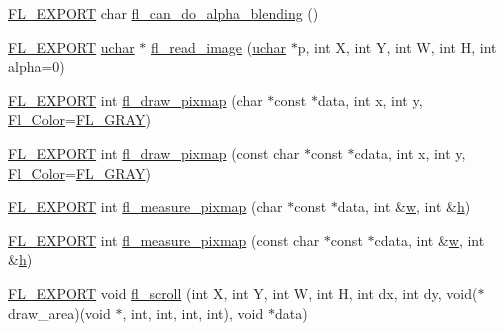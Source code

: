 \begin{DoxyCompactItemize}
\item 
\hyperlink{_fl___export_8_h_aa9ba29a18aee9d738370a06eeb4470fc}{F\+L\+\_\+\+E\+X\+P\+O\+RT} char \hyperlink{group__fl__drawings_gabc04f934741e868e3d537761a955bfdb}{fl\+\_\+can\+\_\+do\+\_\+alpha\+\_\+blending} ()
\item 
\hyperlink{_fl___export_8_h_aa9ba29a18aee9d738370a06eeb4470fc}{F\+L\+\_\+\+E\+X\+P\+O\+RT} \hyperlink{fl__types_8h_a65f85814a8290f9797005d3b28e7e5fc}{uchar} $\ast$ \hyperlink{group__fl__drawings_ga0cdc05d3f7689e1c6b8a26fd0bd97233}{fl\+\_\+read\+\_\+image} (\hyperlink{fl__types_8h_a65f85814a8290f9797005d3b28e7e5fc}{uchar} $\ast$p, int X, int Y, int W, int H, int alpha=0)
\item 
\hyperlink{_fl___export_8_h_aa9ba29a18aee9d738370a06eeb4470fc}{F\+L\+\_\+\+E\+X\+P\+O\+RT} int \hyperlink{group__fl__drawings_gaebd9b6111b8a511eff62749f1b756a31}{fl\+\_\+draw\+\_\+pixmap} (char $\ast$const $\ast$data, int x, int y, \hyperlink{_enumerations_8_h_a8b762953646f8abee866061f1af78a6a}{Fl\+\_\+\+Color}=\hyperlink{_enumerations_8_h_aabb3b3628ea5baa2ba176201ed5d2aba}{F\+L\+\_\+\+G\+R\+AY})
\item 
\hyperlink{_fl___export_8_h_aa9ba29a18aee9d738370a06eeb4470fc}{F\+L\+\_\+\+E\+X\+P\+O\+RT} int \hyperlink{group__fl__drawings_gab830e417d8f17fcd00acdb96711b9119}{fl\+\_\+draw\+\_\+pixmap} (const char $\ast$const $\ast$cdata, int x, int y, \hyperlink{_enumerations_8_h_a8b762953646f8abee866061f1af78a6a}{Fl\+\_\+\+Color}=\hyperlink{_enumerations_8_h_aabb3b3628ea5baa2ba176201ed5d2aba}{F\+L\+\_\+\+G\+R\+AY})
\item 
\hyperlink{_fl___export_8_h_aa9ba29a18aee9d738370a06eeb4470fc}{F\+L\+\_\+\+E\+X\+P\+O\+RT} int \hyperlink{group__fl__drawings_ga1a254e8b7b3699d0d3b9c8e2fb2b5eb6}{fl\+\_\+measure\+\_\+pixmap} (char $\ast$const $\ast$data, int \&\hyperlink{forms_8_h_aac374e320caaadeca4874add33b62af2}{w}, int \&\hyperlink{forms_8_h_a7e427ba5b307f9068129699250690066}{h})
\item 
\hyperlink{_fl___export_8_h_aa9ba29a18aee9d738370a06eeb4470fc}{F\+L\+\_\+\+E\+X\+P\+O\+RT} int \hyperlink{group__fl__drawings_gaedf85a71995496e7cc00b1367d7490b3}{fl\+\_\+measure\+\_\+pixmap} (const char $\ast$const $\ast$cdata, int \&\hyperlink{forms_8_h_aac374e320caaadeca4874add33b62af2}{w}, int \&\hyperlink{forms_8_h_a7e427ba5b307f9068129699250690066}{h})
\item 
\hyperlink{_fl___export_8_h_aa9ba29a18aee9d738370a06eeb4470fc}{F\+L\+\_\+\+E\+X\+P\+O\+RT} void \hyperlink{group__fl__drawings_gaef4a0d81bfafaeb3be15a55b9b58ba5f}{fl\+\_\+scroll} (int X, int Y, int W, int H, int dx, int dy, void($\ast$draw\+\_\+area)(void $\ast$, int, int, int, int), void $\ast$data)

\end{DoxyCompactItemize}

